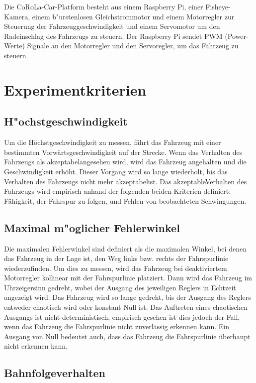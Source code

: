 \documentclass[arbeit=studie,oneside,BCOR=12mm]{ArbeitRST}
\begin{document}
Die CoRoLa-Car-Platform besteht aus einem Raspberry Pi, einer Fisheye-Kamera,
einem b"urstenlosen Gleichstrommotor und einem Motorregler zur Steuerung der
Fahrzeuggeschwindigkeit und einem Servomotor um den Radeinschlag des Fahrzeugs
zu steuern. Der Raspberry Pi sendet PWM (Power-Werte) Signale an den
Motorregler und den Servoregler, um das Fahrzeug zu steuern. 

\section{Experimentkriterien}

\subsection{H"ochstgeschwindigkeit}

Um die Höchstgeschwindigkeit zu messen, fährt das Fahrzeug mit einer bestimmten
Vorwärtsgeschwindigkeit auf der Strecke. Wenn das Verhalten des Fahrzeugs als
\glqq akzeptabel\grqq angesehen wird, wird das Fahrzeug angehalten und die
Geschwindigkeit erhöht. Dieser Vorgang wird so lange wiederholt, bis das
Verhalten des Fahrzeugs nicht mehr \glqq akzeptabel\grqq ist. Das \glqq
akzeptable\grqq Verhalten des Fahrzeugs wird empirisch anhand der folgenden
beiden Kriterien definiert: Fähigkeit, der Fahrspur zu folgen, und Fehlen von
beobachteten Schwingungen.

\subsection{Maximal m"oglicher Fehlerwinkel}

Die maximalen Fehlerwinkel sind definiert als die maximalen Winkel, bei denen
das Fahrzeug in der Lage ist, den Weg links bzw. rechts der Fahrspurlinie
wiederzufinden. Um dies zu messen, wird das Fahrzeug bei deaktiviertem
Motorregler kollinear mit der Fahrspurlinie platziert. Dann wird das Fahrzeug
im Uhrzeigersinn gedreht, wobei der Ausgang des jeweiligen Reglers in Echtzeit
angezeigt wird. Das Fahrzeug wird so lange gedreht, bis der Ausgang des Reglers
entweder chaotisch wird oder konstant Null ist. Das Auftreten eines
chaotischen Ausgangs ist nicht deterministisch, empirisch gesehen ist dies
jedoch der Fall, wenn das Fahrzeug die Fahrspurlinie nicht zuverlässig erkennen
kann. Ein Ausgang von Null bedeutet auch, dass das Fahrzeug die Fahrspurlinie
überhaupt nicht erkennen kann.

\subsection{Bahnfolgeverhalten}
\end{document}
